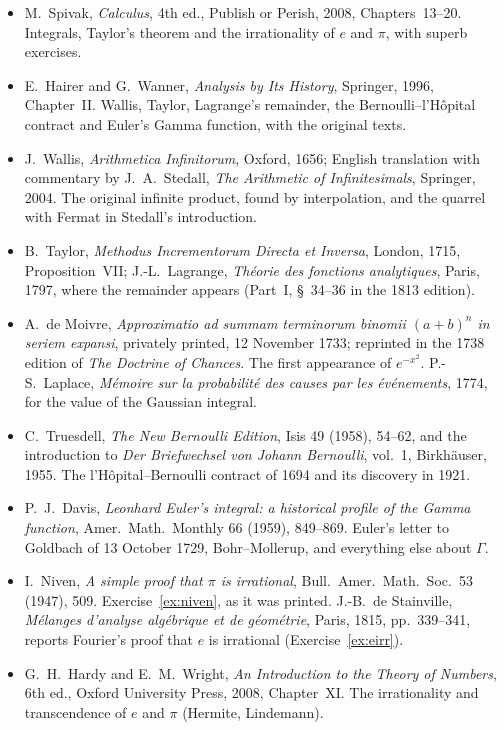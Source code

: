 \begin{itemize}
\item M.~Spivak, \emph{Calculus}, 4th ed., Publish or Perish, 2008, Chapters~13--20. Integrals, Taylor's theorem and the irrationality of $e$ and $\pi$, with superb exercises.
\item E.~Hairer and G.~Wanner, \emph{Analysis by Its History}, Springer, 1996, Chapter~II. Wallis, Taylor, Lagrange's remainder, the Bernoulli--l'H\^opital contract and Euler's Gamma function, with the original texts.
\item J.~Wallis, \emph{Arithmetica Infinitorum}, Oxford, 1656; English translation with commentary by J.~A.~Stedall, \emph{The Arithmetic of Infinitesimals}, Springer, 2004. The original infinite product, found by interpolation, and the quarrel with Fermat in Stedall's introduction.
\item B.~Taylor, \emph{Methodus Incrementorum Directa et Inversa}, London, 1715, Proposition~VII; J.-L.~Lagrange, \emph{Th\'eorie des fonctions analytiques}, Paris, 1797, where the remainder appears (Part~I, \S~34--36 in the 1813 edition).
\item A.~de Moivre, \emph{Approximatio ad summam terminorum binomii $(a+b)^n$ in seriem expansi}, privately printed, 12 November 1733; reprinted in the 1738 edition of \emph{The Doctrine of Chances}. The first appearance of $e^{-x^2}$. P.-S.~Laplace, \emph{M\'emoire sur la probabilit\'e des causes par les \'ev\'enements}, 1774, for the value of the Gaussian integral.
\item C.~Truesdell, \emph{The New Bernoulli Edition}, Isis 49 (1958), 54--62, and the introduction to \emph{Der Briefwechsel von Johann Bernoulli}, vol.~1, Birkh\"auser, 1955. The l'H\^opital--Bernoulli contract of 1694 and its discovery in 1921.
\item P.~J.~Davis, \emph{Leonhard Euler's integral: a historical profile of the Gamma function}, Amer.\ Math.\ Monthly 66 (1959), 849--869. Euler's letter to Goldbach of 13 October 1729, Bohr--Mollerup, and everything else about $\Gamma$.
\item I.~Niven, \emph{A simple proof that $\pi$ is irrational}, Bull.\ Amer.\ Math.\ Soc.\ 53 (1947), 509. Exercise~\ref{ex:niven}, as it was printed. J.-B.~de Stainville, \emph{M\'elanges d'analyse alg\'ebrique et de g\'eom\'etrie}, Paris, 1815, pp.~339--341, reports Fourier's proof that $e$ is irrational (Exercise~\ref{ex:eirr}).
\item G.~H.~Hardy and E.~M.~Wright, \emph{An Introduction to the Theory of Numbers}, 6th ed., Oxford University Press, 2008, Chapter~XI. The irrationality and transcendence of $e$ and $\pi$ (Hermite, Lindemann).

\end{itemize}
